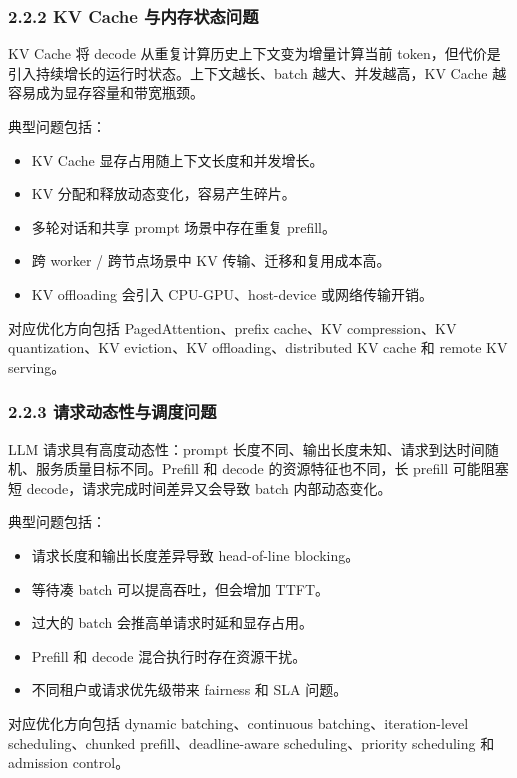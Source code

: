 \documentclass[a4paper,twocolumn,10pt]{ctexart}
\begin{document}
\subsubsection{2.2.2 KV Cache 与内存状态问题}

KV Cache 将 decode 从重复计算历史上下文变为增量计算当前 token，但代价是引入持续增长的运行时状态。上下文越长、batch 越大、并发越高，KV Cache 越容易成为显存容量和带宽瓶颈。


典型问题包括：


\begin{itemize}
\item KV Cache 显存占用随上下文长度和并发增长。

\item KV 分配和释放动态变化，容易产生碎片。

\item 多轮对话和共享 prompt 场景中存在重复 prefill。

\item 跨 worker / 跨节点场景中 KV 传输、迁移和复用成本高。

\item KV offloading 会引入 CPU-GPU、host-device 或网络传输开销。

\end{itemize}
对应优化方向包括 PagedAttention、prefix cache、KV compression、KV quantization、KV eviction、KV offloading、distributed KV cache 和 remote KV serving。




\subsubsection{2.2.3 请求动态性与调度问题}

LLM 请求具有高度动态性：prompt 长度不同、输出长度未知、请求到达时间随机、服务质量目标不同。Prefill 和 decode 的资源特征也不同，长 prefill 可能阻塞短 decode，请求完成时间差异又会导致 batch 内部动态变化。


典型问题包括：


\begin{itemize}
\item 请求长度和输出长度差异导致 head-of-line blocking。

\item 等待凑 batch 可以提高吞吐，但会增加 TTFT。

\item 过大的 batch 会推高单请求时延和显存占用。

\item Prefill 和 decode 混合执行时存在资源干扰。

\item 不同租户或请求优先级带来 fairness 和 SLA 问题。

\end{itemize}
对应优化方向包括 dynamic batching、continuous batching、iteration-level scheduling、chunked prefill、deadline-aware scheduling、priority scheduling 和 admission control。
\end{document}
